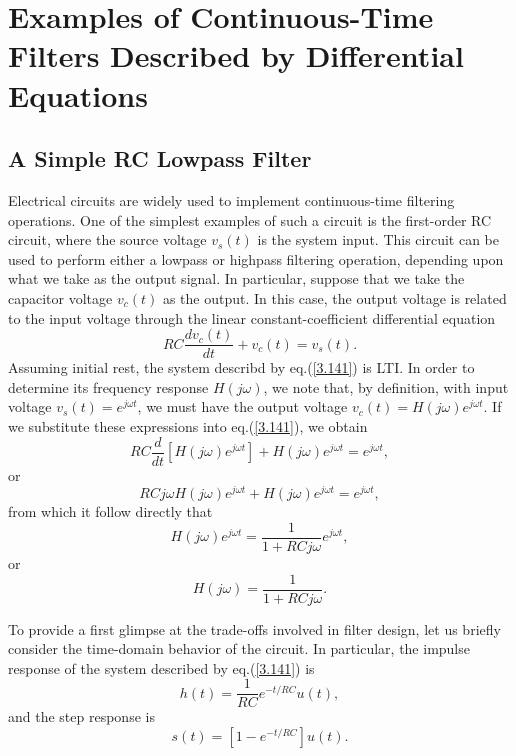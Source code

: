 \documentclass[a4paper,twoside]{book}
\begin{document}
\section{Examples of Continuous-Time Filters Described by Differential Equations}
\label{section:3.10}

\subsection{A Simple RC Lowpass Filter}

Electrical circuits are widely used to implement continuous-time filtering operations. One of the simplest examples of such a circuit is the first-order RC circuit, where the source voltage $v_s(t)$ is the system input. This circuit can be used to perform either a lowpass or highpass filtering operation, depending upon what we take as the output signal. In particular, suppose that we take the capacitor voltage $v_c(t)$ as the output. In this case, the output voltage is related to the input voltage through the linear constant-coefficient differential equation
\begin{equation}
    RC\frac{dv_c(t)}{dt}+v_c(t)=v_s(t).
    \label{3.141}
\end{equation}
Assuming initial rest, the system describd by eq.\;(\ref{3.141}) is LTI. In order to determine its frequency response $H(j\omega)$, we note that, by definition, with input voltage $v_s(t)=e^{j\omega t}$, we must have the output voltage $v_c(t)=H(j\omega)e^{j\omega t}$. If we substitute these expressions into eq.\;(\ref{3.141}), we obtain
\begin{equation}
    RC\frac d{dt}[H(j\omega)e^{j\omega t}]+H(j\omega)e^{j\omega t}=e^{j\omega t},
    \label{3.142}
\end{equation}
or
\begin{equation}
    RCj\omega H(j\omega)e^{j\omega t}+H(j\omega)e^{j\omega t}=e^{j\omega t},
    \label{3.143}
\end{equation}
from which it follow directly that
\begin{equation}
    H(j\omega)e^{j\omega t}=\frac1{1+RCj\omega}e^{j\omega t},
    \label{3.144}
\end{equation}
or
\begin{equation}
    H(j\omega)=\frac1{1+RCj\omega}.
    \label{3.145}
\end{equation}

To provide a first glimpse at the trade-offs involved in filter design, let us briefly consider the time-domain behavior of the circuit. In particular, the impulse response of the system described by eq.\;(\ref{3.141}) is
\begin{equation}
    h(t)=\frac1{RC}e^{-t/RC}u(t),
    \label{3.146}
\end{equation}
and the step response is
\begin{equation}
    s(t)=[1-e^{-t/RC}]u(t).
    \label{3.147}
\end{equation}
\end{document}
